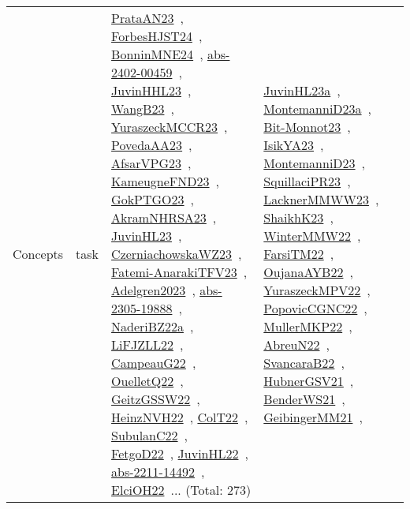 {\begin{longtable}{lp{3cm}>{\raggedright\arraybackslash}p{6cm}>{\raggedright\arraybackslash}p{6cm}>{\raggedright\arraybackslash}p{8cm}}
Concepts & task & \href{../works/PrataAN23.pdf}{PrataAN23}~\cite{PrataAN23}, \href{../works/ForbesHJST24.pdf}{ForbesHJST24}~\cite{ForbesHJST24}, \href{../works/BonninMNE24.pdf}{BonninMNE24}~\cite{BonninMNE24}, \href{../works/abs-2402-00459.pdf}{abs-2402-00459}~\cite{abs-2402-00459}, \href{../works/JuvinHHL23.pdf}{JuvinHHL23}~\cite{JuvinHHL23}, \href{../works/WangB23.pdf}{WangB23}~\cite{WangB23}, \href{../works/YuraszeckMCCR23.pdf}{YuraszeckMCCR23}~\cite{YuraszeckMCCR23}, \href{../works/PovedaAA23.pdf}{PovedaAA23}~\cite{PovedaAA23}, \href{../works/AfsarVPG23.pdf}{AfsarVPG23}~\cite{AfsarVPG23}, \href{../works/KameugneFND23.pdf}{KameugneFND23}~\cite{KameugneFND23}, \href{../works/GokPTGO23.pdf}{GokPTGO23}~\cite{GokPTGO23}, \href{../works/AkramNHRSA23.pdf}{AkramNHRSA23}~\cite{AkramNHRSA23}, \href{../works/JuvinHL23.pdf}{JuvinHL23}~\cite{JuvinHL23}, \href{../works/CzerniachowskaWZ23.pdf}{CzerniachowskaWZ23}~\cite{CzerniachowskaWZ23}, \href{../works/Fatemi-AnarakiTFV23.pdf}{Fatemi-AnarakiTFV23}~\cite{Fatemi-AnarakiTFV23}, \href{../works/Adelgren2023.pdf}{Adelgren2023}~\cite{Adelgren2023}, \href{../works/abs-2305-19888.pdf}{abs-2305-19888}~\cite{abs-2305-19888}, \href{../works/NaderiBZ22a.pdf}{NaderiBZ22a}~\cite{NaderiBZ22a}, \href{../works/LiFJZLL22.pdf}{LiFJZLL22}~\cite{LiFJZLL22}, \href{../works/CampeauG22.pdf}{CampeauG22}~\cite{CampeauG22}, \href{../works/OuelletQ22.pdf}{OuelletQ22}~\cite{OuelletQ22}, \href{../works/GeitzGSSW22.pdf}{GeitzGSSW22}~\cite{GeitzGSSW22}, \href{../works/HeinzNVH22.pdf}{HeinzNVH22}~\cite{HeinzNVH22}, \href{../works/ColT22.pdf}{ColT22}~\cite{ColT22}, \href{../works/SubulanC22.pdf}{SubulanC22}~\cite{SubulanC22}, \href{../works/FetgoD22.pdf}{FetgoD22}~\cite{FetgoD22}, \href{../works/JuvinHL22.pdf}{JuvinHL22}~\cite{JuvinHL22}, \href{../works/abs-2211-14492.pdf}{abs-2211-14492}~\cite{abs-2211-14492}, \href{../works/ElciOH22.pdf}{ElciOH22}~\cite{ElciOH22}... (Total: 273) & \href{../works/JuvinHL23a.pdf}{JuvinHL23a}~\cite{JuvinHL23a}, \href{../works/MontemanniD23a.pdf}{MontemanniD23a}~\cite{MontemanniD23a}, \href{../works/Bit-Monnot23.pdf}{Bit-Monnot23}~\cite{Bit-Monnot23}, \href{../works/IsikYA23.pdf}{IsikYA23}~\cite{IsikYA23}, \href{../works/MontemanniD23.pdf}{MontemanniD23}~\cite{MontemanniD23}, \href{../works/SquillaciPR23.pdf}{SquillaciPR23}~\cite{SquillaciPR23}, \href{../works/LacknerMMWW23.pdf}{LacknerMMWW23}~\cite{LacknerMMWW23}, \href{../works/ShaikhK23.pdf}{ShaikhK23}~\cite{ShaikhK23}, \href{../works/WinterMMW22.pdf}{WinterMMW22}~\cite{WinterMMW22}, \href{../works/FarsiTM22.pdf}{FarsiTM22}~\cite{FarsiTM22}, \href{../works/OujanaAYB22.pdf}{OujanaAYB22}~\cite{OujanaAYB22}, \href{../works/YuraszeckMPV22.pdf}{YuraszeckMPV22}~\cite{YuraszeckMPV22}, \href{../works/PopovicCGNC22.pdf}{PopovicCGNC22}~\cite{PopovicCGNC22}, \href{../works/MullerMKP22.pdf}{MullerMKP22}~\cite{MullerMKP22}, \href{../works/AbreuN22.pdf}{AbreuN22}~\cite{AbreuN22}, \href{../works/SvancaraB22.pdf}{SvancaraB22}~\cite{SvancaraB22}, \href{../works/HubnerGSV21.pdf}{HubnerGSV21}~\cite{HubnerGSV21}, \href{../works/BenderWS21.pdf}{BenderWS21}~\cite{BenderWS21}, \href{../works/GeibingerMM21.pdf}{GeibingerMM21}~\cite{GeibingerMM21}, 
\end{longtable}}

